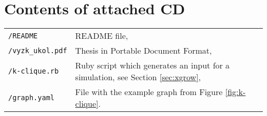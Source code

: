 \appendix
\cleardoublepage{}   %
\chapter{Contents of attached CD}

\begin{tabularx}{\textwidth}{p{7em} X}
	{\tt /README} & README file,\\
	{\tt /vyzk\_ukol.pdf} & Thesis in Portable Document Format,\\
	{\tt /k-clique.rb} & Ruby script which generates an input for a simulation, see Section \ref{sec:xgrow},\\
	{\tt /graph.yaml} & File with the example graph from Figure \ref{fig:k-clique}.
\end{tabularx}
